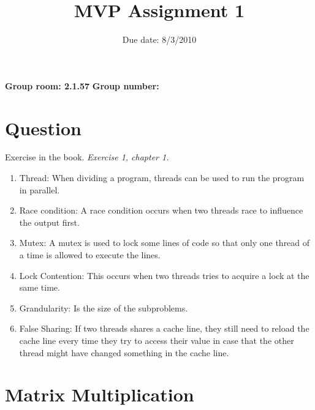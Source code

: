 \documentclass{article}
\title{MVP Assignment 1}
\date{Due date: 8/3/2010}
\begin{document}
\maketitle


\newcommand{\question}[1]{}
\newcommand{\answer}[1]{{#1}}

%
%
\answer{
\begin{flushleft}
{\bf Group room: 2.1.57}
{\bf Group number:}
\end{flushleft}
}

\section{Question}

\begin{ExerciseList}
\Exercise Exercise in the book.
\Question \emph{Exercise 1, chapter 1.}
\Answer
\begin{enumerate}
	\item Thread: When dividing a program, threads can be used to run the program in parallel.
	\item Race condition: A race condition occurs when two threads race to influence the output first. 
	\item Mutex: A mutex is used to lock some lines of code so that only one thread of a time is allowed to execute the lines.
	\item Lock Contention: This occurs when two threads tries to acquire a lock at the same time.
	\item Grandularity: Is the size of the subproblems.
	\item False Sharing: If two threads shares a cache line, they still need to reload the cache line every time they try to access their value in case that 
	the other thread might have changed something in the cache line.
\end{enumerate}

\end{ExerciseList}

\section{Matrix Multiplication}
\end{document}
